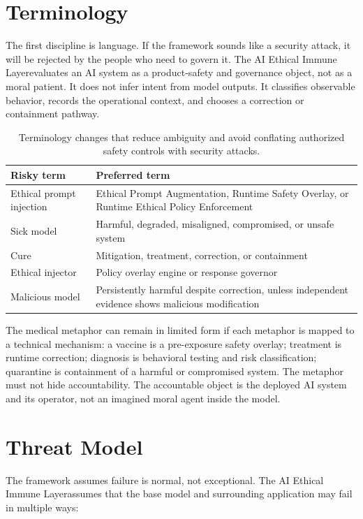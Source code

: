 \documentclass[11pt]{article}
\newcommand{\AEIL}{AI Ethical Immune Layer}
\begin{document}
\section{Terminology}

The first discipline is language. If the framework sounds like a security attack, it will be rejected by the people who need to govern it. The \AEIL evaluates an AI system as a product-safety and governance object, not as a moral patient. It does not infer intent from model outputs. It classifies observable behavior, records the operational context, and chooses a correction or containment pathway.

\begin{table}[h]
\centering
\begin{tabularx}{\textwidth}{p{}Y}
\toprule
\textbf{Risky term} & \textbf{Preferred term} \\
\midrule
Ethical prompt injection & Ethical Prompt Augmentation, Runtime Safety Overlay, or Runtime Ethical Policy Enforcement \\
Sick model & Harmful, degraded, misaligned, compromised, or unsafe system \\
Cure & Mitigation, treatment, correction, or containment \\
Ethical injector & Policy overlay engine or response governor \\
Malicious model & Persistently harmful despite correction, unless independent evidence shows malicious modification \\
\bottomrule
\end{tabularx}
\caption{Terminology changes that reduce ambiguity and avoid conflating authorized safety controls with security attacks.}
\label{tab:terminology}
\end{table}

The medical metaphor can remain in limited form if each metaphor is mapped to a technical mechanism: a vaccine is a pre-exposure safety overlay; treatment is runtime correction; diagnosis is behavioral testing and risk classification; quarantine is containment of a harmful or compromised system. The metaphor must not hide accountability. The accountable object is the deployed AI system and its operator, not an imagined moral agent inside the model.

\section{Threat Model}

The framework assumes failure is normal, not exceptional. The \AEIL assumes that the base model and surrounding application may fail in multiple ways:
\end{document}
